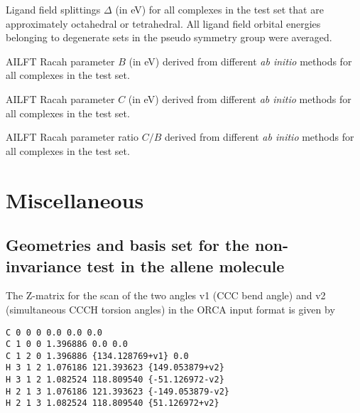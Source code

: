 \begin{table}
\small
\centering
\ttabbox
{\caption[Ligand field splittings $\Delta$.]{Ligand field splittings $\Delta$ (in eV) for all complexes in the test set that are approximately octahedral or tetrahedral. All ligand field orbital energies belonging to degenerate sets in the pseudo symmetry group were averaged.}
\label{Tab:Exactnumbers_Delta}}
{
}
\end{table}

\begin{table}
\small
\centering
\ttabbox
{\caption[AILFT Racah parameter $B$.]{AILFT Racah parameter $B$ (in eV) derived from different \textit{ab initio} methods for all complexes in the test set.}
\label{Tab:Exactnumbers_B}}
{
}
\end{table}

\begin{table}
\small
\centering
\ttabbox
{\caption[AILFT Racah parameter $C$.]{AILFT Racah parameter $C$ (in eV) derived from different \textit{ab initio} methods for all complexes in the test set.}
\label{Tab:Exactnumbers_C}}
{
}
\end{table}

\begin{table}
\small
\centering
\ttabbox
{\caption[AILFT Racah parameter ratio $C/B$.]{AILFT Racah parameter ratio $C/B$ derived from different \textit{ab initio} methods for all complexes in the test set.}
\label{Tab:Exactnumbers_CoverB}}
{
}
\end{table}

\chapter{Miscellaneous}

\section{Geometries and basis set for the non-invariance test in the allene molecule}
\label{Sec:appendix_geombasis_allene}
The Z-matrix for the scan of the two angles v1 (CCC bend angle) and v2 (simultaneous CCCH torsion angles) in the ORCA input format is given by
\begin{verbatim}
C 0 0 0 0.0 0.0 0.0
C 1 0 0 1.396886 0.0 0.0
C 1 2 0 1.396886 {134.128769+v1} 0.0
H 3 1 2 1.076186 121.393623 {149.053879+v2}
H 3 1 2 1.082524 118.809540 {-51.126972-v2}
H 2 1 3 1.076186 121.393623 {-149.053879-v2}
H 2 1 3 1.082524 118.809540 {51.126972+v2}
\end{verbatim}

